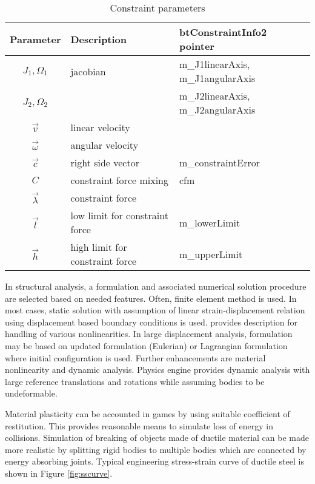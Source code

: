 \begin {table}[htb!]
\caption {Constraint parameters}
\label{tab:constraintParameters} 
\begin{center}
\begin{tabular}{|c| l| l|}
\hline
{\bf Parameter} & {\bf Description} & {\bf btConstraintInfo2 pointer}\\  \hline
$J_1, \Omega_1$ & jacobian & m\_J1linearAxis, m\_J1angularAxis \\
$J_2, \Omega_2$ & & m\_J2linearAxis, m\_J2angularAxis \\ \hline
$\vec{v}$ & linear velocity & \\ \hline
$\vec{\omega}$ & angular velocity & \\ \hline
$\vec{c}$        &  right side vector   & m\_constraintError \\ \hline
$C$  & constraint force mixing & cfm \\  \hline
$\vec{\lambda}$ & constraint force &  \\ \hline
$\vec{l}$ & low limit for constraint force & m\_lowerLimit \\ \hline
$\vec{h}$ & high limit for constraint force & m\_upperLimit \\ \hline
\end {tabular}
\end{center}
\end {table}


In structural analysis, a formulation and associated numerical solution procedure are selected 
based on needed features.
Often,  finite element method is used.
In most cases, static solution with assumption of linear strain-displacement relation
using displacement based boundary conditions is used.
\citet{bathe-1975} provides description for handling of various nonlinearities.
In large displacement analysis, formulation may be based on updated formulation (Eulerian) or
Lagrangian formulation where initial configuration is used.
Further enhancements are material nonlinearity and dynamic analysis.
Physics engine provides dynamic analysis with large reference translations and rotations
while assuming bodies to be undeformable.

Material plasticity can be accounted in games by using suitable coefficient of restitution.
This provides reasonable means to simulate loss of energy in collisions.
Simulation of breaking of objects made of ductile material can be made more realistic by splitting rigid bodies
to multiple bodies which are connected by energy absorbing joints.
Typical engineering stress-strain curve of ductile steel is shown in Figure \ref{fig:sscurve}.

